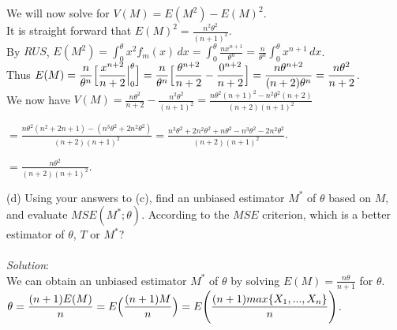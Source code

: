 \documentclass[12pt]{article}
\begin{document}
\noindent
We will now solve for $ V(M) = E(M^{2}) - E(M)^{2} $. \\

\noindent
It is straight forward that $ \displaystyle E(M)^{2} = \frac{n^{2}\theta^{2}}{(n + 1)^{2}} $. \\

\noindent
By $ RUS $, $ \displaystyle E(M^{2}) = \int_{0}^{\theta} x^{2}f_{m}(x) \, dx = \int_{0}^{\theta} \frac{nx^{n+1}}{\theta^{n}} = \frac{n}{\theta^{n}} \int_{0}^{\theta} x^{n + 1} \, dx $. \\

\noindent
Thus $ \displaystyle E(M) = \frac{n}{\theta^{n}} \Bigl[ \frac{x^{n + 2}}{n + 2} \Big|_{0}^{\theta} \Bigr] = \frac{n}{\theta^{n}} \Bigl[ \frac{\theta^{n + 2}}{n + 2} - \frac{0^{n + 2}}{n + 2} \Bigr] = \frac{n\theta^{n + 2}}{(n + 2)\theta^{n}} = \frac{n\theta^{2}}{n + 2} $. \\

\noindent
We now have $ \displaystyle V(M) = \frac{n\theta^{2}}{n + 2} - \frac{n^{2}\theta^{2}}{(n + 1)^{2}} = \frac{n\theta^{2}(n + 1)^{2} - n^{2}\theta^{2}(n + 2)}{(n + 2)(n + 1)^{2}} $

$ \displaystyle = \frac{n\theta^{2}(n^{2} + 2n + 1) - (n^{3}\theta^{2} + 2n^{2}\theta^{2})}{(n + 2)(n + 1)^{2}} = \frac{n^{3}\theta^{2} + 2n^{2}\theta^{2} + n\theta^{2} - n^{3}\theta^{2} - 2n^{2}\theta^{2}}{(n + 2)(n + 1)^{2}} $.

$ \displaystyle = \frac{n\theta^{2}}{(n + 2)(n + 1)^{2}} $. \\
\newpage


(d) Using your answers to (c), find an unbiased estimator $ M^{*} $ of $ \theta $ based on $ M $, and evaluate $ MSE(M^{*}; \theta) $. According to the $ MSE $ criterion, which is a better estimator of $ \theta $, $ T $ or $ M^{*} $?  \\
\vspace{2.5mm} \\
\textit{Solution}:
\vspace{2.5mm} \\

\noindent
We can obtain an unbiased estimator $ M^{*} $ of $ \theta $ by solving $ \displaystyle E(M) = \frac{n\theta}{n + 1} $ for $ \theta $. \\

\noindent
$ \displaystyle \theta = \frac{(n + 1)E(M)}{n} = E\Bigl( \frac{(n + 1)M}{n} \Bigr) = E\Biggl( \frac{(n + 1)max\{X_{1},...,X_{n}\}}{n} \Biggr) $. \\
\end{document}
